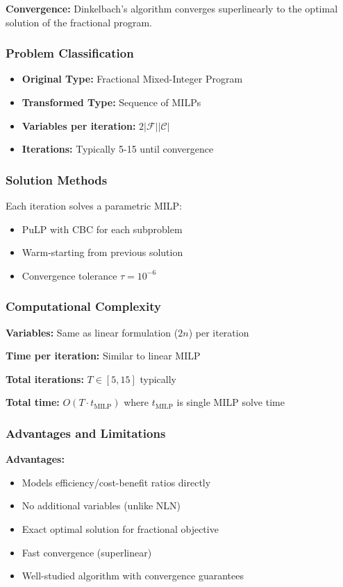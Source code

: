 \documentclass[11pt,a4paper]{article}
\begin{document}
\textbf{Convergence:} Dinkelbach's algorithm converges superlinearly to the optimal solution of the fractional program.

\subsubsection{Problem Classification}
\begin{itemize}
    \item \textbf{Original Type:} Fractional Mixed-Integer Program
    \item \textbf{Transformed Type:} Sequence of MILPs
    \item \textbf{Variables per iteration:} $2|\mathcal{F}||\mathcal{C}|$
    \item \textbf{Iterations:} Typically 5-15 until convergence
\end{itemize}

\subsubsection{Solution Methods}

Each iteration solves a parametric MILP:
\begin{itemize}
    \item PuLP with CBC for each subproblem
    \item Warm-starting from previous solution
    \item Convergence tolerance $\tau = 10^{-6}$
\end{itemize}

\subsubsection{Computational Complexity}

\textbf{Variables:} Same as linear formulation ($2n$) per iteration

\textbf{Time per iteration:} Similar to linear MILP

\textbf{Total iterations:} $T \in [5, 15]$ typically

\textbf{Total time:} $O(T \cdot t_{\text{MILP}})$ where $t_{\text{MILP}}$ is single MILP solve time

\subsubsection{Advantages and Limitations}

\textbf{Advantages:}
\begin{itemize}
    \item Models efficiency/cost-benefit ratios directly
    \item No additional variables (unlike NLN)
    \item Exact optimal solution for fractional objective
    \item Fast convergence (superlinear)
    \item Well-studied algorithm with convergence guarantees
\end{itemize}
\end{document}
